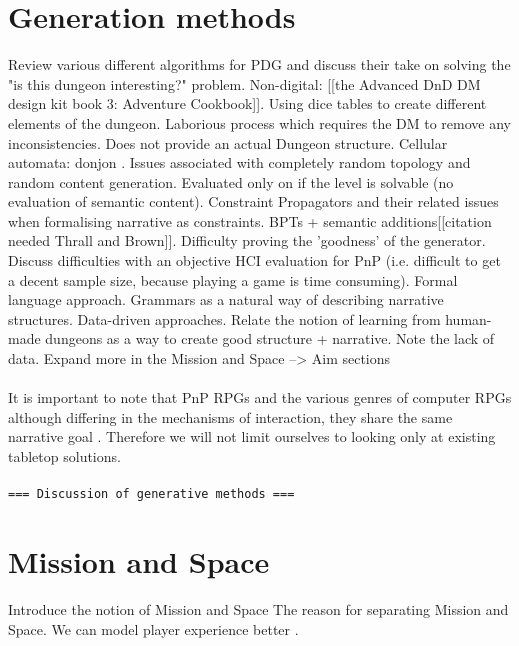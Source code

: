 \documentclass{UoYCSproject}
\begin{document}
\section{Generation methods}
\begin{outline}
  \1 Review various different algorithms for PDG and discuss their take on solving the "is this dungeon interesting?" problem.
    \2 Non-digital: [[the Advanced DnD DM design kit book 3: Adventure Cookbook]]. Using dice tables to create different elements of the dungeon. Laborious process which requires the DM to remove any inconsistencies. Does not provide an actual Dungeon structure.
    \2 Cellular automata: donjon \parencite{donjonCA}. Issues associated with completely random topology and random content generation. Evaluated only on if the level is solvable (no evaluation of semantic content).
    \2 Constraint Propagators and their related issues when formalising narrative as constraints.
    \2 BPTs + semantic additions[[citation needed Thrall and Brown]]. Difficulty proving the 'goodness' of the generator. Discuss difficulties with an objective HCI evaluation for PnP (i.e. difficult to get a decent sample size, because playing a game is time consuming).
    \2 Formal language approach. Grammars \parencite{DormansMS,Deery,Cadogan} as a natural way of describing narrative structures.
    \2 Data-driven approaches. \parencite{SummervilleLearningOfZelda,SummervillePCGML,SummervilleSamplingHyrule} Relate the notion of learning from human-made dungeons as a way to create good structure + narrative. Note the lack of data. Expand more in the Mission and Space --> Aim sections
\end{outline}

\paragraph{}
It is important to note that PnP RPGs and the various genres of computer RPGs although differing in the mechanisms of interaction, they share the same narrative goal \parencite{Tychsen2006}. Therefore we will not limit ourselves to looking only at existing tabletop solutions.

\paragraph{}
\texttt{=== Discussion of generative methods ===}


\section{Mission and Space}
\begin{outline}
  \1 Introduce the notion of Mission and Space
  \1 The reason for separating Mission and Space. We can model player experience better \parencite{DormansMS,SummervilleLearningOfZelda}.
\end{outline}
\end{document}
